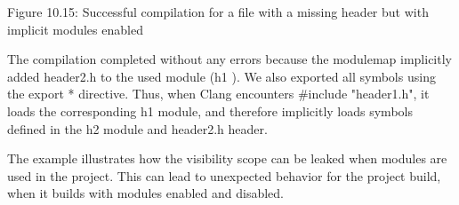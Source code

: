 \begin{center}
Figure 10.15: Successful compilation for a file with a missing header but with implicit modules enabled
\end{center}

The compilation completed without any errors because the modulemap implicitly added header2.h to the used module (h1 ). We also exported all symbols using the export * directive. Thus, when Clang encounters \#include "header1.h", it loads the corresponding h1 module, and therefore implicitly loads symbols defined in the h2 module and header2.h header.

The example illustrates how the visibility scope can be leaked when modules are used in the project. This can lead to unexpected behavior for the project build, when it builds with modules enabled and disabled.










